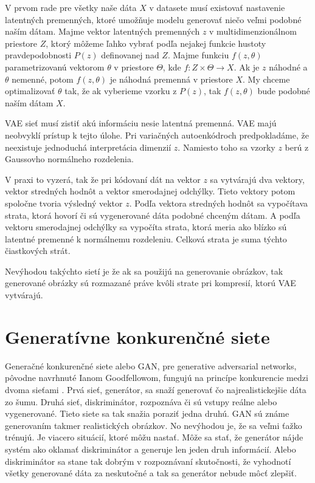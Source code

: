 V prvom rade pre všetky naše dáta \(X\) v datasete musí existovať nastavenie latentných premenných, ktoré umožňuje modelu generovať niečo veľmi podobné naším dátam.
Majme vektor latentných premenných \(z\) v multidimenzionálnom priestore \(Z\), ktorý môžeme ľahko vybrať podľa nejakej funkcie hustoty pravdepodobnosti \(P(z)\) definovanej nad \(Z\).
Majme funkciu \(f(z, \theta)\) parametrizovanú vektorom \(\theta\) v priestore \(\Theta\), kde \(f: Z \times \Theta \rightarrow X\).
Ak je \(z\) náhodné a \(\theta\) nemenné, potom \(f(z, \theta)\) je náhodná premenná v priestore \(X\).
My chceme optimalizovať \(\theta\) tak, že ak vyberieme vzorku z \(P(z)\), tak \(f(z, \theta)\) bude podobné naším dátam \(X\).

VAE sieť musí zistiť akú informáciu nesie latentná premenná.
VAE majú neobvyklí prístup k tejto úlohe.
Pri variačných autoenkódroch predpokladáme, že neexistuje jednoduchá interpretácia dimenzií \(z\).
Namiesto toho sa vzorky \(z\) berú z Gaussovho normálneho rozdelenia.

V praxi to vyzerá, tak že pri kódovaní dát na vektor \(z\) sa vytvárajú dva vektory, vektor stredných hodnôt a vektor smerodajnej odchýlky.
Tieto vektory potom spoločne tvoria výsledný vektor \(z\).
Podľa vektora stredných hodnôt sa vypočítava strata, ktorá hovorí či sú vygenerované dáta podobné chceným dátam.
A podľa vektoru smerodajnej odchýlky sa vypočíta strata, ktorá meria ako blízko sú latentné premenné k normálnemu rozdeleniu.
Celková strata je suma týchto čiastkových strát.

Nevýhodou takýchto sietí je že ak sa použijú na generovanie obrázkov, tak generované obrázky sú rozmazané práve kvôli strate pri kompresií, ktorú VAE vytvárajú.

\section{Generatívne konkurenčné siete}
Generačné konkurenčné siete alebo GAN, pre generative adversarial networks, pôvodne navrhnuté Ianom Goodfellowom, fungujú na princípe konkurencie medzi dvoma sieťami \cite{GAN}.
Prvá sieť, generátor, sa snaží generovať čo najrealistickejšie dáta zo šumu.
Druhá sieť, diskriminátor,  rozpoznáva či sú vstupy reálne alebo vygenerované.
Tieto siete sa tak snažia poraziť jedna druhú.
GAN sú známe generovaním takmer realistických obrázkov.
No nevýhodou je, že sa veľmi ťažko trénujú. Je viacero situácií, ktoré môžu nastať. Môže sa stať, že generátor nájde systém ako oklamať diskriminátor a generuje len jeden druh informácií.
Alebo diskriminátor sa stane tak dobrým v rozpoznávaní skutočnosti, že vyhodnotí všetky generované dáta za neskutočné a tak sa generátor nebude môcť zlepšiť.

